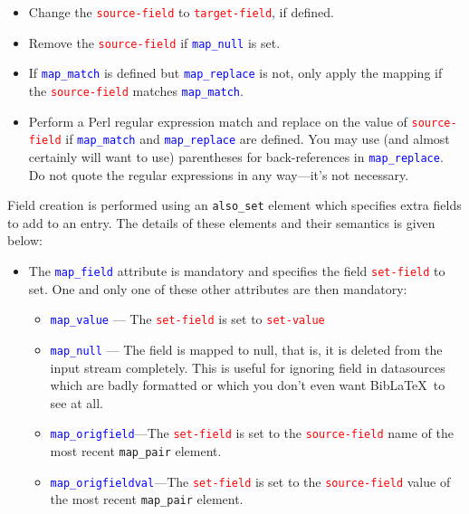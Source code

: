 \documentclass{ltxdockit}
\begin{document}
\begin{itemize}
\item Change the \textcolor{red}{\texttt{source-field}} to
  \textcolor{red}{\texttt{target-field}}, if defined.
\item Remove the \textcolor{red}{\texttt{source-field}} if
  \textcolor{blue}{\texttt{map\_null}} is set.
\item If \textcolor{blue}{\texttt{map\_match}} is defined but
  \textcolor{blue}{\texttt{map\_replace}} is not, only apply the
  mapping if the \textcolor{red}{\texttt{source-field}} matches
  \textcolor{blue}{\texttt{map\_match}}.
\item Perform a Perl regular expression match and replace on the value of
  \textcolor{red}{\texttt{source-field}} if
  \textcolor{blue}{\texttt{map\_match}} and
  \textcolor{blue}{\texttt{map\_replace}} are defined. You may use (and almost certainly
  will want to use) parentheses for back-references in \textcolor{blue}{\texttt{map\_replace}}.
  Do not quote the regular expressions in any way---it's not
  necessary.
\end{itemize}

\noindent Field creation is performed using an \verb+also_set+ element
which specifies extra fields to add to an entry. The details of these
elements and their semantics is given below:\\

\begin{itemize}
\item The \textcolor{blue}{\texttt{map\_field}} attribute is
  mandatory and specifies the field \textcolor{red}{\texttt{set-field}} to
  set. One and only one of these other attributes are then mandatory:
  \begin{itemize}
    \item \textcolor{blue}{\texttt{map\_value}} --- The
      \textcolor{red}{\texttt{set-field}} is set to
      \textcolor{red}{\texttt{set-value}}
    \item \textcolor{blue}{\texttt{map\_null}} --- The field is mapped to
      null, that is, it is deleted from the input stream completely. This
      is useful for ignoring field in datasources which are badly formatted
      or which you don't even want Bib\LaTeX\ to see at all.
      \item \textcolor{blue}{\texttt{map\_origfield}}---The
        \textcolor{red}{\texttt{set-field}} is set to the
        \textcolor{red}{\texttt{source-field}} name of the most recent
        \verb+map_pair+ element.
      \item \textcolor{blue}{\texttt{map\_origfieldval}}---The
        \textcolor{red}{\texttt{set-field}} is set to the
        \textcolor{red}{\texttt{source-field}} value of the most recent
        \verb+map_pair+ element.
  \end{itemize}
\end{itemize}
\end{document}
